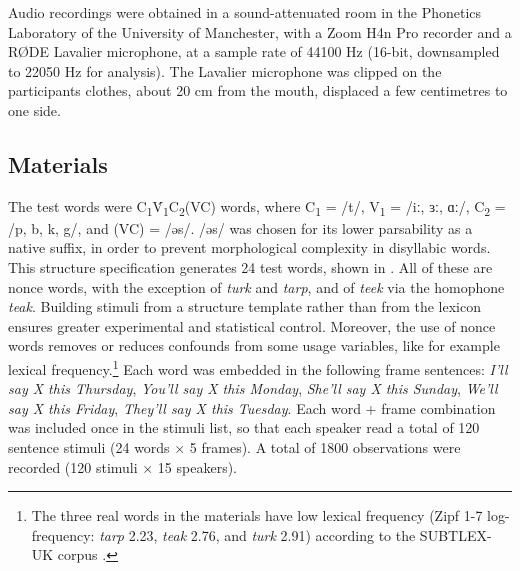 \documentclass[
  12pt,
  a4paper,
  authoryear, 5p]{elsarticle}
\begin{document}
Audio recordings were obtained in a sound-attenuated room in the
Phonetics Laboratory of the University of Manchester, with a Zoom H4n
Pro recorder and a RØDE Lavalier microphone, at a sample rate of 44100
Hz (16-bit, downsampled to 22050 Hz for analysis). The Lavalier
microphone was clipped on the participants clothes, about 20 cm from the
mouth, displaced a few centimetres to one side.

\hypertarget{materials}{%
\subsection{Materials}\label{materials}}


The test words were
C\textsubscript{1}V́\textsubscript{1}C\textsubscript{2}(VC) words, where
C\textsubscript{1} = /t/, V\textsubscript{1} = /iː, ɜː, ɑː/,
C\textsubscript{2} = /p, b, k, g/, and (VC) = /əs/. /əs/ was chosen for
its lower parsability as a native suffix, in order to prevent
morphological complexity in disyllabic words. This structure
specification generates 24 test words, shown in . All of
these are nonce words, with the exception of \emph{turk} and
\emph{tarp}, and of \emph{teek} via the homophone \emph{teak}. Building
stimuli from a structure template rather than from the lexicon ensures
greater experimental and statistical control. Moreover, the use of nonce
words removes or reduces confounds from some usage variables, like for
example lexical
frequency.\footnote{The three real words in the materials have low lexical frequency (Zipf 1-7 log-frequency: \textit{tarp} 2.23, \textit{teak} 2.76, and \textit{turk} 2.91) according to the SUBTLEX-UK corpus \citep{van-heuven2014}.}
Each word was embedded in the following frame sentences: \emph{I'll say
X this Thursday}, \emph{You'll say X this Monday}, \emph{She'll say X
this Sunday}, \emph{We'll say X this Friday}, \emph{They'll say X this
Tuesday}. Each word + frame combination was included once in the stimuli
list, so that each speaker read a total of 120 sentence stimuli (24
words × 5 frames). A total of 1800 observations were recorded (120
stimuli × 15 speakers).
\end{document}
